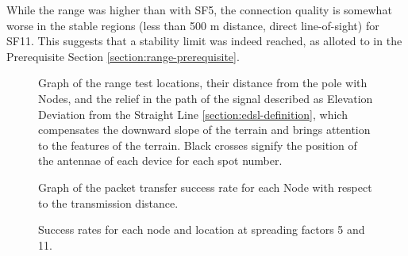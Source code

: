 While the range was higher than with SF5, the connection quality is somewhat worse in the stable regions (less than 500 m distance, direct line-of-sight) for SF11. This suggests that a stability limit was indeed reached, as alloted to in the Prerequisite Section \ref{section:range-prerequisite}.

\begin{figure}[p]
    \centering
    \subfloat[SF11]{} \hfil
    \subfloat[SF5]{}
    \caption{\label{fig:range-relief}Graph of the range test locations, their distance from the pole with Nodes, and the relief in the path of the signal described as Elevation Deviation from the Straight Line \ref{section:edsl-definition}, which compensates the downward slope of the terrain and brings attention to the features of the terrain. Black crosses signify the position of the antennae of each device for each spot number.}
\end{figure}

\begin{figure}[p]
    \centering
    \subfloat[SF11]{} \hfil
    \subfloat[SF5]{}
    \caption{\label{fig:range-results}Graph of the packet transfer success rate for each Node with respect to the transmission distance.}
\end{figure}

\begin{figure}[p]
\begin{minipage}[t]{.45\textwidth}
    \vspace{0pt}
    
\end{minipage}
\begin{minipage}[t]{.45\textwidth}
    \vspace{0pt}
            
\end{minipage}
\caption{\label{table:range-results}Success rates for each node and location at spreading factors 5 and 11.}
\end{figure}

